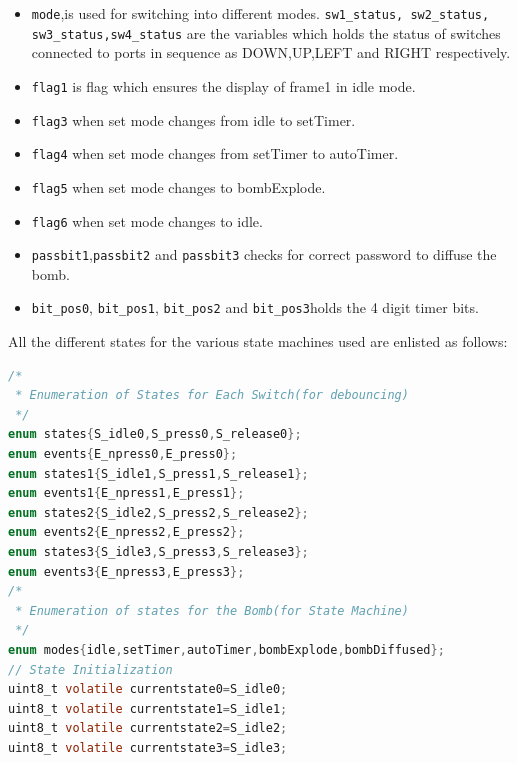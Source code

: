 \documentclass{article}
\begin{document}
\begin{itemize}
  \item \texttt{mode},is used for switching into different modes. \texttt{sw1\_status, sw2\_status, sw3\_status,sw4\_status} are the variables which holds the status of switches connected to ports in sequence as  DOWN,UP,LEFT and RIGHT respectively. 
  \item \texttt{flag1} is flag which ensures the display of frame1 in idle mode.
  \item \texttt{flag3} when set mode changes from idle to setTimer.
  \item \texttt{flag4} when set mode changes from setTimer to autoTimer.
  \item \texttt{flag5} when set mode changes to bombExplode.
  \item \texttt{flag6} when set mode changes to idle.
  \item \texttt{passbit1},\texttt{passbit2} and \texttt{passbit3} checks for correct password to diffuse the bomb.
  \item \texttt{bit\_pos0}, \texttt{bit\_pos1}, \texttt{bit\_pos2} and \texttt{bit\_pos3}holds the 4 digit timer bits.
\end{itemize}
\qquad All the different states for the various state machines used are enlisted as follows:
  \begin{lstlisting}[basicstyle = \small, language = C]
/*
 * Enumeration of States for Each Switch(for debouncing)
 */
enum states{S_idle0,S_press0,S_release0};
enum events{E_npress0,E_press0};
enum states1{S_idle1,S_press1,S_release1};
enum events1{E_npress1,E_press1};
enum states2{S_idle2,S_press2,S_release2};
enum events2{E_npress2,E_press2};
enum states3{S_idle3,S_press3,S_release3};
enum events3{E_npress3,E_press3};
/*
 * Enumeration of states for the Bomb(for State Machine)
 */
enum modes{idle,setTimer,autoTimer,bombExplode,bombDiffused};
// State Initialization
uint8_t volatile currentstate0=S_idle0;
uint8_t volatile currentstate1=S_idle1;
uint8_t volatile currentstate2=S_idle2;
uint8_t volatile currentstate3=S_idle3;
  \end{lstlisting}
\end{document}
